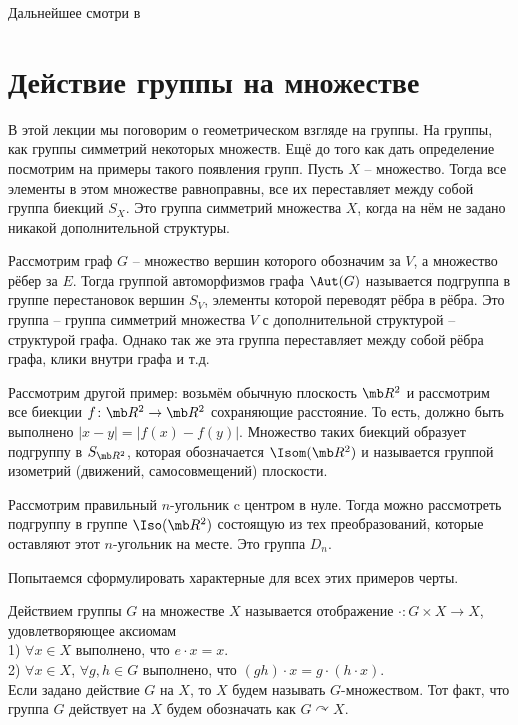 Дальнейшее смотри в \cite{}


\section{Действие группы на множестве}


В этой лекции мы поговорим о геометрическом взгляде на группы. На группы, как группы симметрий некоторых множеств. Ещё до того как дать определение посмотрим на примеры такого появления групп. Пусть $X$ -- множество. Тогда все элементы в этом множестве равноправны, все их переставляет между собой группа биекций $S_X$. Это группа симметрий множества $X$, когда на нём не задано никакой дополнительной структуры. 

Рассмотрим граф $G$ -- множество вершин которого обозначим за $V$, а множество рёбер за $E$. Тогда группой автоморфизмов графа  $\Aut(G)$ называется подгруппа в группе перестановок вершин $S_V$, элементы которой переводят рёбра в рёбра. Это группа -- группа симметрий множества $V$ с дополнительной структурой -- структурой графа. Однако так же эта группа переставляет между собой рёбра графа, клики внутри графа и т.д.

Рассмотрим другой пример: возьмём обычную плоскость $\mb R^2$ и рассмотрим все биекции $f\colon \mb R^2 \to \mb R^2$ сохраняющие расстояние. То есть, должно быть выполнено $|x-y|=|f(x)-f(y)|$. Множество таких биекций образует подгруппу в $S_{\mb R^2}$, которая обозначается $\Isom(\mb R^2)$ и называется группой изометрий (движений, самосовмещений) плоскости. 

Рассмотрим правильный $n$-угольник c  центром в нуле. Тогда можно рассмотреть подгруппу в группе $\Iso (\mb R^2)$ состоящую из тех преобразований, которые оставляют этот $n$-угольник на месте. Это группа $D_n$.

Попытаемся сформулировать характерные для всех этих примеров черты.


\begin{defn}
Действием группы $G$ на множестве $X$ называется отображение $\cdot \colon G\times X\to X$, удовлетворяющее аксиомам\\
1) $\forall x \in X$  выполнено, что $e\cdot x=x$.\\
2) $\forall x \in X$, $\forall g,h\in G$ выполнено, что $(gh)\cdot x= g\cdot (h\cdot x)$.\\
Если задано действие $G$ на $X$, то $X$ будем называть $G$-множеством. Тот факт, что группа $G$ действует на $X$ будем обозначать как $G \curvearrowright X$. 
\end{defn}


